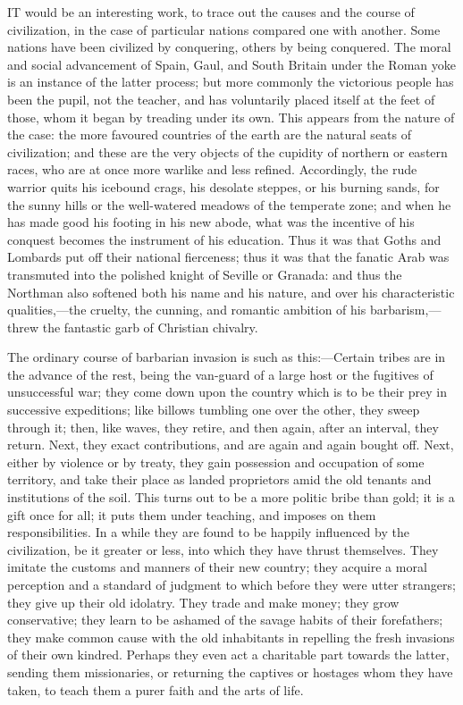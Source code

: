 IT
would be an interesting work, to trace out the causes and the course
of civilization, in the case of particular nations compared one with
another. Some nations have been civilized by conquering, others by
being conquered. The moral and social advancement of Spain, Gaul, and
South Britain under the Roman yoke is an instance of the latter
process; but more commonly the victorious people has been the pupil,
not the teacher, and has voluntarily placed itself at the feet of
those, whom it began by treading under its own. This appears from the
nature of the case: the more favoured countries of the earth are the
natural seats of civilization; and these are the very objects of the
cupidity of northern or eastern races, who are at once more warlike
and less refined. Accordingly, the rude warrior quits his icebound
crags, his desolate steppes, or his burning sands, for the sunny hills
or the well-watered meadows of the temperate zone; and when he has
made good his footing in his new abode, what was the incentive of his
conquest becomes the instrument of his education. Thus it was that
Goths and Lombards put off their national fierceness; thus it was that
the fanatic Arab was transmuted into the polished knight of Seville or
Granada: and thus the Northman also softened both his name and his
nature, and over his characteristic qualities,—the cruelty, the
cunning, and romantic ambition of his barbarism,—threw the fantastic
garb of Christian chivalry.

The ordinary course of
barbarian invasion is such as this:—Certain tribes are in the
advance of the rest, being the van-guard of a large host or the
fugitives of unsuccessful war; they come down upon the country which
is to be their prey in successive expeditions; like billows tumbling
one over the other, they sweep through it; then, like waves, they
retire, and then again, after an interval, they return. Next, they
exact contributions, and are again and again bought off. Next, either
by violence or by treaty, they gain possession and occupation of some
territory, and take their place as landed proprietors amid the old
tenants and institutions of the soil. This turns out to be a more
politic bribe than gold; it is a gift once for all; it puts them under
teaching, and imposes on them responsibilities. In a while they are
found to be happily influenced by the civilization, be it greater or
less, into which they have thrust themselves. They imitate the customs
and manners of their new country; they acquire a moral perception and
a standard of judgment to which before they were utter strangers; they
give up their old idolatry. They trade and make money; they grow
conservative; they learn to be ashamed of the savage habits of their
forefathers; they make common cause with the old inhabitants in
repelling the fresh invasions of their own kindred. Perhaps they even
act a charitable part towards the latter, sending them missionaries,
or returning the captives or hostages whom they have taken, to teach
them a purer faith and the arts of life.

